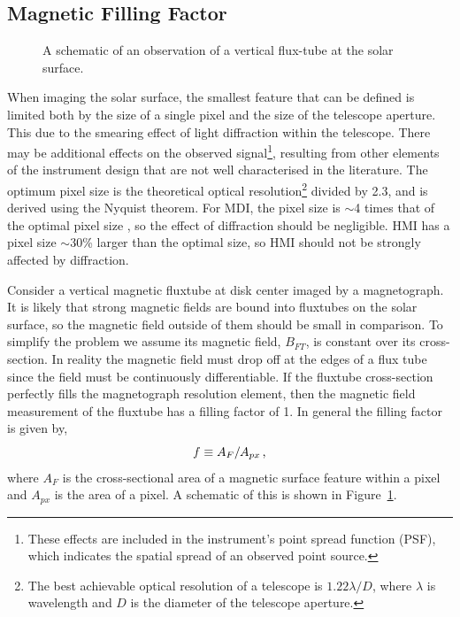 \subsection{Magnetic Filling Factor}\label{sect:fillfact}

\begin{figure}[!t]
\caption[A flux-tube observation schematic.]{A schematic of an observation of a vertical flux-tube at the solar surface.}\label{fig:ftschem}
\end{figure}

When imaging the solar surface, the smallest feature that can be defined is limited both by the size of a single pixel and the size of the telescope aperture. This due to the smearing effect of  light diffraction within the telescope. There may be additional effects on the observed signal\footnote{These effects are included in the instrument's point spread function (PSF), which indicates the spatial spread of an observed point source.}, resulting from other elements of the instrument design that are not well characterised in the literature. The optimum pixel size is the theoretical optical resolution\footnote{The best achievable optical resolution of a telescope is $1.22\lambda/D$, where $\lambda$ is wavelength and $D$ is the diameter of the telescope aperture.} divided by 2.3, and is derived using the Nyquist theorem. For MDI, the pixel size is $\sim$4 times that of the optimal pixel size \citep{Schou:2012}, so the effect of diffraction should be negligible. HMI has a pixel size $\sim$30\% larger than the optimal size, so HMI should not be strongly affected by diffraction. 

Consider a vertical magnetic \gls{fluxtube} at disk center imaged by a magnetograph. It is likely that strong magnetic fields are bound into \glspl{fluxtube} on the solar surface, so the magnetic field outside of them should be small in comparison. To simplify the problem we assume its magnetic field, $B_{FT}$, is constant over its cross-section. In reality the magnetic field must drop off at the edges of a flux tube since the field must be continuously differentiable. If the \gls{fluxtube} cross-section perfectly fills the magnetograph resolution element, then the magnetic field measurement of the \gls{fluxtube} has a filling factor of 1. In general the filling factor is given by,
\begin{equation}
f \equiv A_{F}/A_{px} \mbox{\,,}
\end{equation}
where $A_{F}$ is the cross-sectional area of a magnetic surface feature within a pixel and $A_{px}$ is the area of a pixel. A schematic of this is shown in Figure~\ref{fig:ftschem}.

